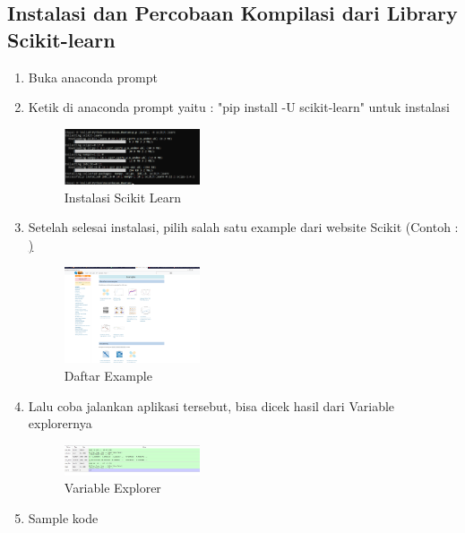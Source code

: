 \subsection{Instalasi dan Percobaan Kompilasi dari Library Scikit-learn}
\begin{enumerate}
	\item Buka anaconda prompt
	\item Ketik di anaconda prompt yaitu : "pip install -U scikit-learn" untuk instalasi \hfill \break
	\begin{figure}[H]
		\includegraphics[width=4cm]{figures/1174035/chapter1/1_1.png}
		\centering
		\caption{Instalasi Scikit Learn}
	\end{figure}
	\item Setelah selesai instalasi, pilih salah satu example dari website Scikit (Contoh : \href{https://scikit-learn.org/stable/auto_examples/index.html})
	\begin{figure}[H]
		\includegraphics[width=4cm]{figures/1174035/chapter1/1_2.png}
		\centering
		\caption{Daftar Example}
	\end{figure}
	\item Lalu coba jalankan aplikasi tersebut, bisa dicek hasil dari Variable explorernya
	\begin{figure}[H]
		\includegraphics[width=4cm]{figures/1174035/chapter1/1_3.png}
		\centering
		\caption{Variable Explorer}
	\end{figure}
	\item Sample kode \hfill \break 
\end{enumerate}

